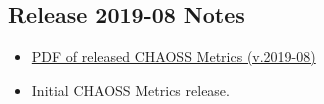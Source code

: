 \hypertarget{release-2019-08-notes}{%
\subsection{Release 2019-08 Notes}\label{release-2019-08-notes}}

\begin{itemize}
\tightlist
\item
  \href{https://chaoss.github.io/website/release/release-pdfs/CHAOSS-Metrics-Release-2019-08.pdf}{PDF
  of released CHAOSS Metrics (v.2019-08)}
\item
  Initial CHAOSS Metrics release.
\end{itemize}
